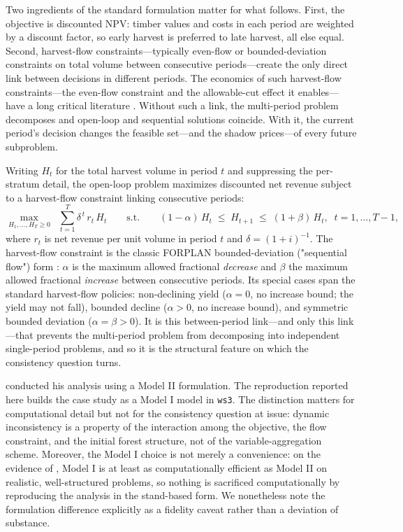 Two ingredients of the standard formulation matter for what follows. First, the objective is discounted NPV: timber values and costs in each period are weighted by a discount factor, so early harvest is preferred to late harvest, all else equal. Second, harvest-flow constraints---typically even-flow or bounded-deviation constraints on total volume between consecutive periods---create the only direct link between decisions in different periods. The economics of such harvest-flow constraints---the even-flow constraint and the allowable-cut effect it enables---have a long critical literature \citep{thompson1966traditional,schweitzer1972allowable,luckert1995allowable,hegan2000economic}. Without such a link, the multi-period problem decomposes and open-loop and sequential solutions coincide. With it, the current period's decision changes the feasible set---and the shadow prices---of every future subproblem.

Writing \(H_t\) for the total harvest volume in period \(t\) and suppressing the per-stratum detail, the open-loop problem maximizes discounted net revenue subject to a harvest-flow constraint linking consecutive periods:
\begin{equation}
\max_{H_1, \ldots, H_T \geq 0} \;\; \sum_{t=1}^{T} \delta^{\,t} \, r_t \, H_t
\qquad \text{s.t.} \qquad
(1 - \alpha)\, H_t \;\le\; H_{t+1} \;\le\; (1 + \beta)\, H_t, \;\; t = 1, \ldots, T-1,
\label{eq:openloop}
\end{equation}
where \(r_t\) is net revenue per unit volume in period \(t\) and \(\delta = (1+i)^{-1}\). The harvest-flow constraint is the classic FORPLAN bounded-deviation ("sequential flow") form \citep[eq.~3-4, 3-5]{daugherty1991credibility}: \(\alpha\) is the maximum allowed fractional \emph{decrease} and \(\beta\) the maximum allowed fractional \emph{increase} between consecutive periods. Its special cases span the standard harvest-flow policies: non-declining yield (\(\alpha = 0\), no increase bound; the yield may not fall), bounded decline (\(\alpha > 0\), no increase bound), and symmetric bounded deviation (\(\alpha = \beta > 0\)). It is this between-period link---and only this link---that prevents the multi-period problem from decomposing into independent single-period problems, and so it is the structural feature on which the consistency question turns.

\citet{daugherty1991credibility} conducted his analysis using a Model II formulation. The reproduction reported here builds the case study as a Model I model in \texttt{ws3}. The distinction matters for computational detail but not for the consistency question at issue: dynamic inconsistency is a property of the interaction among the objective, the flow constraint, and the initial forest structure, not of the variable-aggregation scheme. Moreover, the Model I choice is not merely a convenience: on the evidence of \citet{martin2017comparing}, Model I is at least as computationally efficient as Model II on realistic, well-structured problems, so nothing is sacrificed computationally by reproducing the analysis in the stand-based form. We nonetheless note the formulation difference explicitly as a fidelity caveat rather than a deviation of substance.

